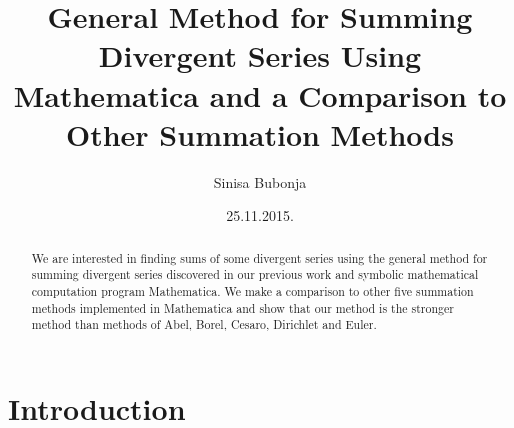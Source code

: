 \documentclass[12pt]{article}
\title{General Method for Summing Divergent Series Using Mathematica and a Comparison to Other Summation Methods}
\author{Sinisa Bubonja}
\date{25.11.2015.}
\begin{document}
\maketitle
\begin{abstract}
We are interested in finding sums of some divergent series using the general method for summing divergent series discovered in our previous work\cite{bub} and symbolic mathematical computation program Mathematica. We make a comparison to other five summation methods implemented in Mathematica and show that our method is the stronger method than methods of Abel, Borel, Cesaro, Dirichlet and Euler.
\end{abstract}

\tableofcontents  
  
\section{Introduction}
\end{document}
